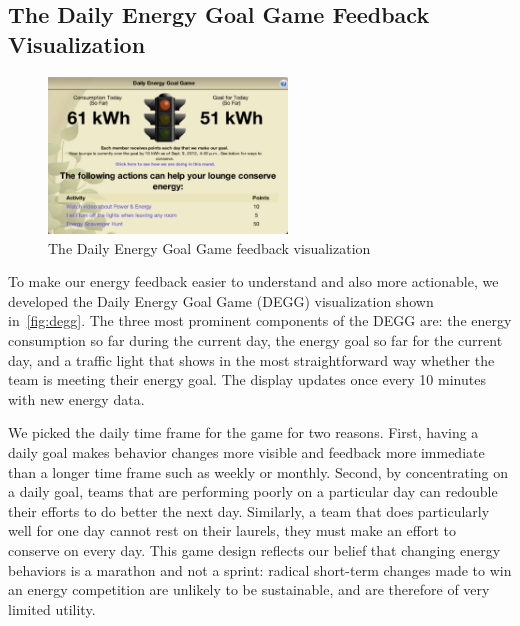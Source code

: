 \documentclass[10pt, conference, compsocconf]{IEEEtran}
\begin{document}
\subsection{The Daily Energy Goal Game Feedback Visualization}

\begin{figure}[!tb]
	\centering
	\includegraphics[width=2.5in]{degg.eps}
	\caption{The Daily Energy Goal Game feedback visualization}
	\label{fig:degg}
\end{figure}

To make our energy feedback easier to understand and also more actionable, we developed the Daily Energy Goal Game (DEGG) visualization shown in~\autoref{fig:degg}. The three most prominent components of the DEGG are: the energy consumption so far during the current day, the energy goal so far for the current day, and a traffic light that shows in the most straightforward way whether the team is meeting their energy goal. The display updates once every 10 minutes with new energy data.

We picked the daily time frame for the game for two reasons. First, having a daily goal makes behavior changes more visible and feedback more immediate than a longer time frame such as weekly or monthly. Second, by concentrating on a daily goal, teams that are performing poorly on a particular day can redouble their efforts to do better the next day. Similarly, a team that does particularly well for one day cannot rest on their laurels, they must make an effort to conserve on every day. This game design reflects our belief that changing energy behaviors is a marathon and not a sprint: radical short-term changes made to win an energy competition are unlikely to be sustainable, and are therefore of very limited utility.
\end{document}
